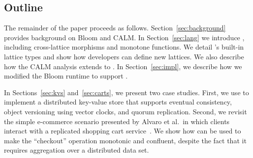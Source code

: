 % 

\subsection{Outline}
The remainder of the paper proceeds as follows.  Section~\ref{sec:background}
provides background on Bloom and CALM.  In Section~\ref{sec:lang} we introduce
\lang, including cross-lattice morphisms and monotone functions. We detail
\lang's built-in lattice types and show how developers can define new lattices.
We also describe how the CALM analysis extends to \lang.  In
Section~\ref{sec:impl}, we describe how we modified the Bloom runtime to support
\lang.

In Sections~\ref{sec:kvs} and~\ref{sec:carts}, we present two case studies.
First, we use \lang to implement a distributed key-value store that supports
eventual consistency, object versioning using vector clocks, and quorum
replication. Second, we revisit the simple e-commerce scenario presented by
Alvaro et al.\ in which clients interact with a replicated shopping cart
service~\cite{Alvaro2011}. We show how \lang can be used to make the
``checkout'' operation monotonic and confluent, despite the fact that it
requires aggregation over a distributed data set.

